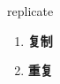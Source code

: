 
\begin{frame}
{\huge replicate}
\begin{center}
\begin{enumerate}\Large
  \item \textbf{复制}
  \item \textbf{重复}
\end{enumerate}
\end{center}
\end{frame}
